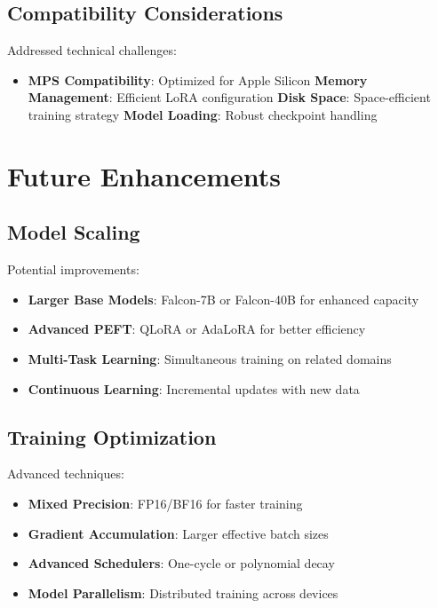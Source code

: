 \documentclass[12pt,a4paper]{article}
\begin{document}
\subsection{Compatibility Considerations}
Addressed technical challenges:

\begin{itemize}
    \item \textbf{MPS Compatibility}: Optimized for Apple Silicon
    \textbf{Memory Management}: Efficient LoRA configuration
    \textbf{Disk Space}: Space-efficient training strategy
    \textbf{Model Loading}: Robust checkpoint handling
\end{itemize}

\section{Future Enhancements}

\subsection{Model Scaling}
Potential improvements:

\begin{itemize}
    \item \textbf{Larger Base Models}: Falcon-7B or Falcon-40B for enhanced capacity
    \item \textbf{Advanced PEFT}: QLoRA or AdaLoRA for better efficiency
    \item \textbf{Multi-Task Learning}: Simultaneous training on related domains
    \item \textbf{Continuous Learning}: Incremental updates with new data
\end{itemize}

\subsection{Training Optimization}
Advanced techniques:

\begin{itemize}
    \item \textbf{Mixed Precision}: FP16/BF16 for faster training
    \item \textbf{Gradient Accumulation}: Larger effective batch sizes
    \item \textbf{Advanced Schedulers}: One-cycle or polynomial decay
    \item \textbf{Model Parallelism}: Distributed training across devices
\end{itemize}
\end{document}
